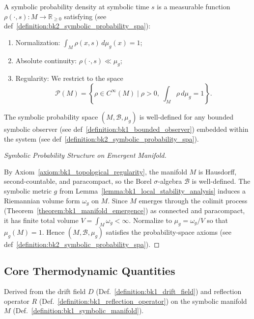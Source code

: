 \begin{definition} 
\label{definition:bk2__symbolic_probability_density} 
A symbolic probability density at symbolic time $s$ is a measurable function $\rho(\cdot, s): M \rightarrow \mathbb{R}_{\geq 0}$ satisfying (see def~\ref{definition:bk2_symbolic_probability_spa}):
\begin{enumerate}
    \item Normalization: $\int_M \rho(x, s) \, d\mu_g(x) = 1$;
    \item Absolute continuity: $\rho(\cdot, s) \ll \mu_g$;
    \item Regularity: We restrict to the space
    \[
    \mathcal{P}(M) = \left\{ \rho \in C^\infty(M) \mid \rho > 0,\; \int_M \rho \, d\mu_g = 1 \right\}.
    \]
\end{enumerate}
\end{definition}

\begin{lemma} 
\label{lemma:bk2_wellposedness_symb_prob_space} 
The symbolic probability space $(M, \mathcal{B}, \mu_g)$ is well-defined for any bounded symbolic observer (see def~\ref{definition:bk1_bounded_observer}) embedded within the system (see def~\ref{definition:bk2_symbolic_probability_spa}).
\end{lemma}

\begin{proof}[Symbolic Probability Structure on Emergent Manifold]
\label{proof:bk2_probability_structure_on_manifold}
\leavevmode

By Axiom~\ref{axiom:bk1_topological_regularity}, the manifold $M$ is Hausdorff, second-countable, and paracompact, so the Borel $\sigma$-algebra $\mathcal{B}$ is well-defined.
The symbolic metric $g$ from Lemma~\ref{lemma:bk1_local_stability_analysis} induces a Riemannian volume form $\omega_g$ on $M$.
Since $M$ emerges through the colimit process (Theorem~\ref{theorem:bk1_manifold_emergence}) as connected and paracompact, it has finite total volume $V = \int_M \omega_g < \infty$.
Normalize to $\mu_g = \omega_g/V$ so that $\mu_g(M)=1$. Hence $(M, \mathcal{B}, \mu_g)$ satisfies the probability-space axioms (see def~\ref{definition:bk2_symbolic_probability_spa}).
\end{proof}

\subsection{Core Thermodynamic Quantities}
\label{subsec:bk2_core_thermodynamic_quantities}
Derived from the drift field $D$ (Def.~\ref{definition:bk1_drift_field}) and reflection operator $R$ (Def.~\ref{definition:bk1_reflection_operator}) on the symbolic manifold $M$ (Def.~\ref{definition:bk1_symbolic_manifold}).

